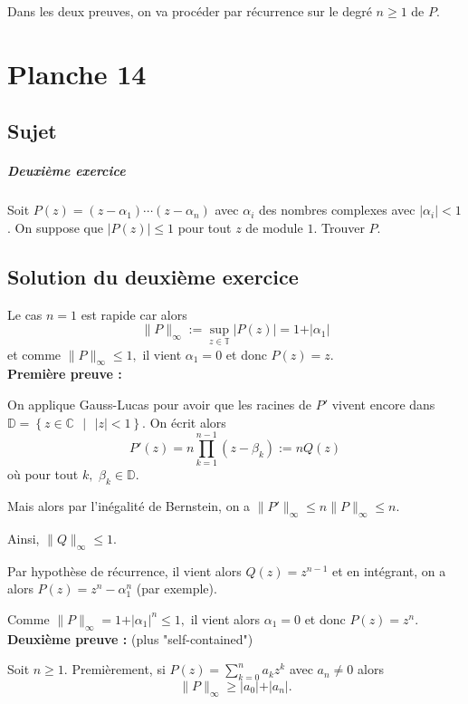 Dans les deux preuves, on va procéder par récurrence sur le degré $n\geq 1$ de $P.$
\chapter{Planche 14}

\section{Sujet}

\paragraph{Deuxième exercice}
Soit $P(z) = (z-\alpha_1)\cdots(z-\alpha_n)$ avec $\alpha_i$ des nombres complexes avec $|\alpha_i| < 1$.
On suppose que $|P(z)| \leqslant 1$ pour tout $z$ de module $1$.
Trouver $P$.

\section{Solution du deuxième exercice}

Le cas $n=1$ est rapide car alors $$\|P\|_{\infty}:=\sup_{z\in\mathbb{T}}\vert P(z)\vert=1+\vert \alpha_{1} \vert$$ et comme $\|P\|_{\infty}\leq 1,$ il vient $\alpha_{1}=0$ et donc $P(z)=z.$\\

\textbf{Première preuve :}

On applique Gauss-Lucas pour avoir que les racines de $P'$ vivent encore dans $\displaystyle \mathbb{D}=\left\{z\in\mathbb{C}\mbox{ }|\mbox{ } \vert z\vert <1\right\}.$
On écrit alors $$ P'(z)=n\prod_{k=1}^{n-1}(z-\beta_{k}):=nQ(z)$$ où pour tout $k,$ $\beta_{k}\in\mathbb{D}.$

Mais alors par l'inégalité de Bernstein, on a $\displaystyle \|P'\|_{\infty}\leq n\|P\|_{\infty}\leq n.$

Ainsi, $\|Q\|_{\infty}\leq 1.$

Par hypothèse de récurrence, il vient alors $Q(z)=z^{n-1}$ et en intégrant, on a alors $\displaystyle P(z)=z^{n}-\alpha_{1}^{n}$ (par exemple).

Comme $\displaystyle \|P\|_{\infty}=1+\vert \alpha_{1}\vert^{n}\leq 1,$ il vient alors $\alpha_{1}=0$ et donc $P(z)=z^{n}.$\\

\textbf{Deuxième preuve :} (plus "self-contained")

Soit $n\geq 1.$ Premièrement, si $\displaystyle P(z)=\sum_{k=0}^{n}a_{k}z^{k}$ avec $a_{n}\neq 0$ alors $$\|P\|_{\infty}\geq \vert a_{0} \vert + \vert a_{n}\vert.$$

